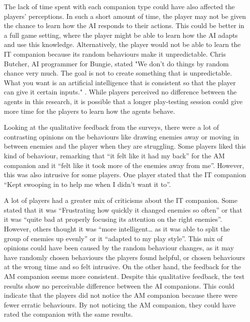 \documentclass{IEEEtran}
\begin{document}
The lack of time spent with each companion type could have also affected the players' perceptions. In such a short amount of time, the player may not be given the chance to learn how the AI responds to their actions. This could be better in a full game setting, where the player might be able to learn how the AI adapts and use this knowledge. Alternatively, the player would not be able to learn the IT companion because its random behaviours make it unpredictable. Chris Butcher, AI programmer for Bungie, stated "We don't do things by random chance very much. The goal is not to create something that is unpredictable. What you want is an artificial intelligence that is consistent so that the player can give it certain inputs." \cite{HowStuffWorksHaloAI}. While players perceived no difference between the agents in this research, it is possible that a longer play-testing session could give more time for the players to learn how the agents behave.


Looking at the qualitative feedback from the surveys, there were a lot of contrasting opinions on the behaviours like drawing enemies away or moving in between enemies and the player when they are struggling. Some players liked this kind of behaviour, remarking that “it felt like it had my back” for the AM companion and it “felt like it took more of the enemies away from me”. However, this was also intrusive for some players. One player stated that the IT companion “Kept swooping in to help me when I didn’t want it to”.

A lot of players had a greater mix of criticisms about the IT companion. Some stated that it was “Frustrating how quickly it changed enemies so often” or that it was “quite bad at properly focusing its attention on the right enemies”. However, others thought it was “more intelligent… as it was able to split the group of enemies up evenly” or it “adapted to my play style”. This mix of opinions could have been caused by the random behaviour changes, as it may have randomly chosen behaviours the players found helpful, or chosen behaviours at the wrong time and so felt intrusive. On the other hand, the feedback for the AM companion seems more consistent. Despite this qualitative feedback, the test results show no perceivable difference between the AI companions. This could indicate that the players did not notice the AM companion because there were fewer erratic behaviours. By not noticing the AM companion, they could have rated the companion with the same results.
\end{document}

